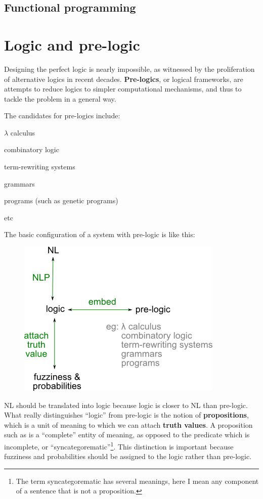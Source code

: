 \subsection{Functional programming}

\section{Logic and pre-logic}

Designing the perfect logic is nearly impossible, as witnessed by the proliferation of alternative logics in recent decades.  \textbf{Pre-logics}, or logical frameworks, are attempts to reduce logics to simpler computational mechanisms, and thus to tackle the problem in a general way.

The candidates for pre-logics include:
\begin{compactenum}[\textbullet ]
\item $\lambda$ calculus
\item combinatory logic
\item term-rewriting systems
\item grammars
\item programs (such as genetic programs)
\item etc
\end{compactenum}

The basic configuration of a system with pre-logic is like this:
\begin{figure}[H]
\centering
\includegraphics[scale=0.7]{prelogic.png}
\end{figure}
NL should be translated into logic because logic is closer to NL than pre-logic.  What really distinguishes ``logic'' from pre-logic is the notion of \textbf{propositions}, which is a unit of meaning to which we can attach \textbf{truth values}.  A proposition such as  is a ``complete'' entity of meaning, as opposed to the predicate  which is incomplete, or ``syncategorematic''\footnote{The term syncategorematic has several meanings, here I mean any component of a sentence that is not a proposition.}.  This distinction is important because fuzziness and probabilities should be assigned to the logic rather than pre-logic.

